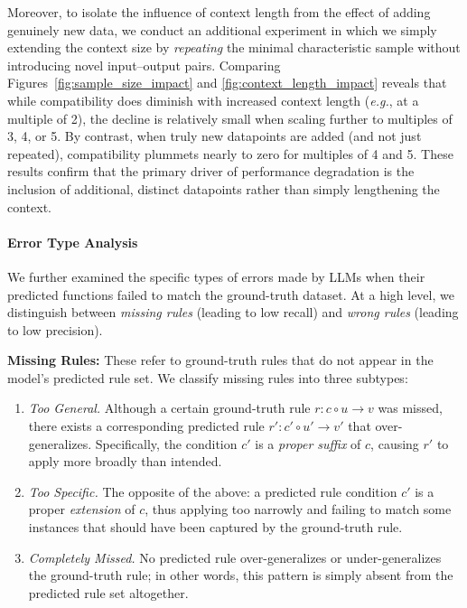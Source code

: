 



Moreover, to isolate the influence of context length from the effect of adding genuinely new data, we conduct an additional experiment in which we simply extending the context size by \emph{repeating} the minimal characteristic sample without introducing novel input–output pairs. Comparing Figures~\ref{fig:sample_size_impact} and \ref{fig:context_length_impact} reveals that while compatibility does diminish with increased context length (\emph{e.g.}, at a multiple of 2), the decline is relatively small when scaling further to multiples of 3, 4, or 5. By contrast, when truly new datapoints are added (and not just repeated), compatibility plummets nearly to zero for multiples of 4 and 5. These results confirm that the primary driver of performance degradation is the inclusion of additional, distinct datapoints rather than simply lengthening the context.

\paragraph{Error Type Analysis} We further examined the specific types of errors made by LLMs when their predicted functions failed to match the ground-truth dataset. At a high level, we distinguish between \emph{missing rules} (leading to low recall) and \emph{wrong rules} (leading to low precision).

\textbf{Missing Rules:}
These refer to ground-truth rules that do not appear in the model's predicted rule set. We classify missing rules into three subtypes: 
\begin{enumerate} \item \emph{Too General.} Although a certain ground-truth rule $r:c\circ u\to v$ was missed, there exists a corresponding predicted rule $r': c'\circ u'\to v'$ that over-generalizes. Specifically, the condition $c'$ is a \emph{proper suffix} of $c$, causing $r'$ to apply more broadly than intended.
\item \emph{Too Specific.} The opposite of the above: a predicted rule condition $c'$ is a proper \emph{extension} of $c$, thus applying too narrowly and failing to match some instances that should have been captured by the ground-truth rule.
\item \emph{Completely Missed.} No predicted rule over-generalizes or under-generalizes the ground-truth rule; in other words, this pattern is simply absent from the predicted rule set altogether. \end{enumerate}

